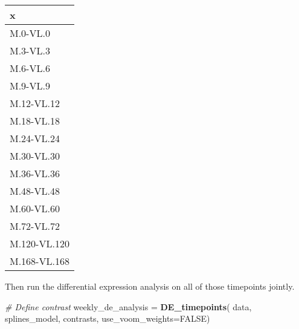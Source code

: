 \documentclass[9pt,a4paper,]{extarticle}
\newenvironment{Shaded}{\begin{snugshade}}{\end{snugshade}}
\newcommand{\CommentTok}[1]{\textcolor[rgb]{0.56,0.35,0.01}{\textit{#1}}}
\newcommand{\DataTypeTok}[1]{\textcolor[rgb]{0.13,0.29,0.53}{#1}}
\newcommand{\KeywordTok}[1]{\textcolor[rgb]{0.13,0.29,0.53}{\textbf{#1}}}
\newcommand{\NormalTok}[1]{#1}
\newcommand{\OtherTok}[1]{\textcolor[rgb]{0.56,0.35,0.01}{#1}}
\newcommand{\StringTok}[1]{\textcolor[rgb]{0.31,0.60,0.02}{#1}}
\begin{document}
\begin{tabular}{l}
\hline
x\\
\hline
M.0-VL.0\\
\hline
M.3-VL.3\\
\hline
M.6-VL.6\\
\hline
M.9-VL.9\\
\hline
M.12-VL.12\\
\hline
M.18-VL.18\\
\hline
M.24-VL.24\\
\hline
M.30-VL.30\\
\hline
M.36-VL.36\\
\hline
M.48-VL.48\\
\hline
M.60-VL.60\\
\hline
M.72-VL.72\\
\hline
M.120-VL.120\\
\hline
M.168-VL.168\\
\hline
\end{tabular}

Then run the differential expression analysis on all of those timepoints
jointly.

\begin{Shaded}
\begin{Highlighting}[]
\CommentTok{# Define contrast   }
\NormalTok{weekly_de_analysis =}\StringTok{ }\KeywordTok{DE_timepoints}\NormalTok{(}
\NormalTok{     data, splines_model, contrasts,}
     \DataTypeTok{use_voom_weights=}\OtherTok{FALSE}\NormalTok{)}
\end{Highlighting}
\end{Shaded}
\end{document}
